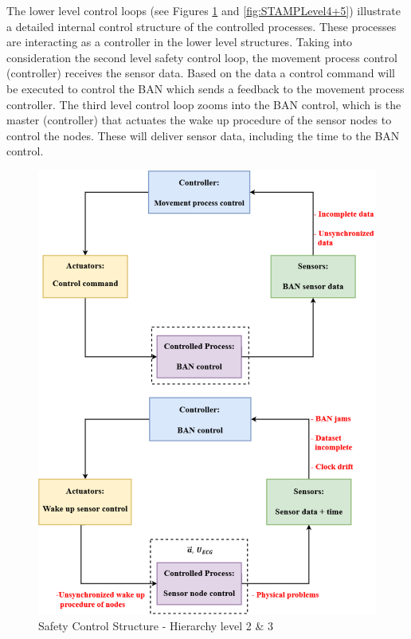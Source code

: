 \documentclass[10pt,journal,compsoc]{IEEEtran}
\begin{document}
	The lower level control loops (see Figures \ref{fig:STAMPLevel2+3} and \ref{fig:STAMPLevel4+5}) illustrate a detailed internal control structure of the controlled processes. These processes are interacting as a controller in the lower level structures. Taking into consideration the second level safety control loop, the movement process control (controller) receives the sensor data. Based on the data a control command will be executed to control the BAN which sends a feedback to the movement process controller. The third level control loop zooms into the BAN control, which is the master (controller) that actuates the wake up procedure of the sensor nodes to control the nodes. These will deliver sensor data, including the time to the BAN control.
	\begin{figure}[!ht]
		\centering
		\includegraphics[scale=0.35]{Images/STAMP2+3level(3).eps}
		\caption[Safety Control Structure - Hierarchy level 2 \& 3]{Safety Control Structure - Hierarchy level 2 \& 3}
		\label{fig:STAMPLevel2+3}
	\end{figure} 
\end{document}
